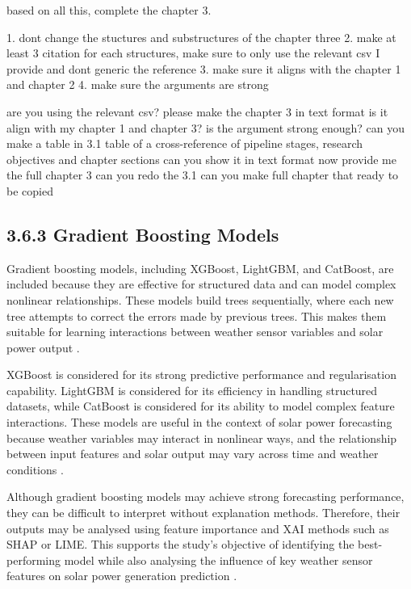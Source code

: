 based on all this, complete the chapter 3. 

1. dont change the stuctures and substructures of the chapter three
2. make at least 3 citation for each structures, make sure to only use the relevant csv I provide and dont generic the reference
3. make sure it aligns with the chapter 1 and chapter 2
4. make sure the arguments are strong

are you using the relevant csv? 
please make the chapter 3 in text format
is it align with my chapter 1 and chapter 3? is the argument strong enough?
can you make a table in 3.1
table of a cross-reference of pipeline stages, research objectives and chapter sections
can you show it in text format
now provide me the full chapter 3
can you redo the 3.1
can you make full chapter that ready to be copied

\subsection{3.6.3 Gradient Boosting Models}

Gradient boosting models, including XGBoost, LightGBM, and CatBoost, are included because they are effective for structured data and can model complex nonlinear relationships. These models build trees sequentially, where each new tree attempts to correct the errors made by previous trees. This makes them suitable for learning interactions between weather sensor variables and solar power output \parencite{JnanaVarshitha2025, Bakht2025, Alhassan2025}.

XGBoost is considered for its strong predictive performance and regularisation capability. LightGBM is considered for its efficiency in handling structured datasets, while CatBoost is considered for its ability to model complex feature interactions. These models are useful in the context of solar power forecasting because weather variables may interact in nonlinear ways, and the relationship between input features and solar output may vary across time and weather conditions \parencite{CarvalhoJunior2025, Pongphaw2025, TsaiLo2025}.

Although gradient boosting models may achieve strong forecasting performance, they can be difficult to interpret without explanation methods. Therefore, their outputs may be analysed using feature importance and XAI methods such as SHAP or LIME. This supports the study’s objective of identifying the best-performing model while also analysing the influence of key weather sensor features on solar power generation prediction \parencite{JnanaVarshitha2025, Eren2025, Duvuru2026}.

